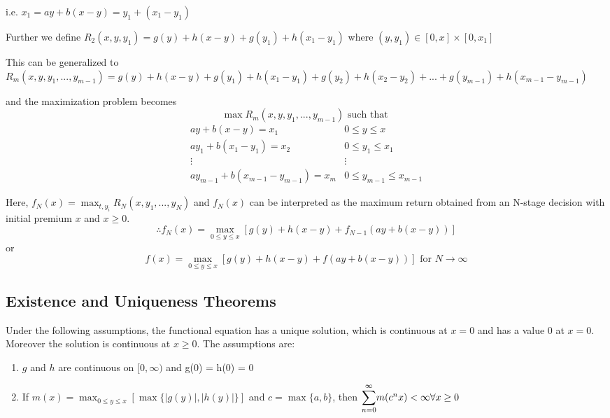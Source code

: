 i.e. $x_1 = ay + b(x-y) = y_1 + (x_1-y_1)$

Further we define $R_2(x, y, y_1) = g(y) + h(x-y) + g(y_1) + h(x_1-y_1)$ where $(y, y_1) \in [0, x] \times [0, x_1]$

\vspace{5mm}
This can be generalized to $R_m(x, y, y_1, ..., y_{m-1}) = g(y) + h(x-y) + g(y_1) + h(x_1-y_1) + g(y_2) + h(x_2-y_2) + ... + g(y_{m-1}) + h(x_{m-1} - y_{m-1})$

and the maximization problem becomes
\[
\max R_m(x, y, y_1, ..., y_{m-1}) \text{ such that }
\]
\[ 
\begin{array}{ll}
    ay+b(x-y) = x_1 & 0 \le y \le x \\
    ay_1+b(x_1-y_1) = x_2 & 0 \le y_1 \le x_1 \\
    \vdots & \vdots\\
    ay_{m-1}+b(x_{m-1}-y_{m-1}) = x_m & 0 \le y_{m-1} \le x_{m-1}
\end{array}
\]

Here, $f_N(x) = \max_{t, y_i} R_N(x, y_1, ..., y_N)$ and $f_N(x)$ can be interpreted as the maximum return obtained from an N-stage decision with initial premium $x$ and $x \ge 0$.
$$
\therefore f_N(x) = \max_{0 \le y \le x} [g(y) + h(x-y) + f_{N-1}(ay+b(x-y))]
$$
or 
$$
f(x) = \max_{0 \le y \le x} [g(y) + h(x-y) + f(ay+b(x-y))] \text{ for } N \rightarrow \infty
$$

\subsection{Existence and Uniqueness Theorems}
Under the following assumptions, the functional equation has a unique solution, which is continuous at $x=0$ and has a value 0 at $x=0$. Moreover the solution is continuous at $x \ge 0$.
\newpage
The assumptions are:
\begin{enumerate}
    \item $g$ and $h$ are continuous on $[0, \infty)$ and g(0) = h(0) = 0
    \item If $m(x) = \max_{0 \le y \le x} [\max\{|g(y)|, |h(y)|\}]$ and $c = \max \{a, b\}$, then $\bigsum_{n=0}^{\infty} m(c^nx) < \infty \forall x \ge 0$
\end{enumerate}

